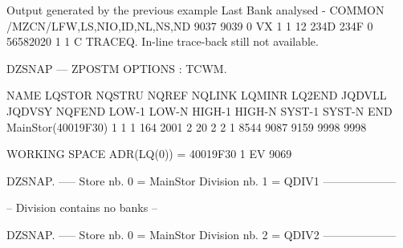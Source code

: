 \begin{landscapebody}
\begin{XMPt}{Output generated by the previous example}
Last Bank analysed - COMMON /MZCN/LFW,LS,NIO,ID,NL,NS,ND
       9037      9039   0  VX         1       1      12
          234D         234F            0     56582020            1            1            C
 TRACEQ.  In-line trace-back still not available.
                                                                                                                                 
DZSNAP --- ZPOSTM                                                                                  OPTIONS : TCWM.               
                                                                                                                                 
  NAME       LQSTOR NQSTRU  NQREF NQLINK LQMINR LQ2END JQDVLL JQDVSY NQFEND  LOW-1  LOW-N HIGH-1 HIGH-N SYST-1 SYST-N    END     
 MainStor(40019F30)      1      1      1    164   2001      2     20      2      2      1   8544   9087   9159   9998   9998     
                                                                                                                                 
 WORKING SPACE   ADR(LQ(0)) = 40019F30                                                                                           
          1    EV        9069                                                                                                    
                                                                                                                                 
DZSNAP.   -----  Store nb. 0 = MainStor Division nb. 1 = QDIV1                       --------------------                        
                                                                                                                                 
         -- Division contains no banks --                                                                                        
                                                                                                                                 
DZSNAP.   -----  Store nb. 0 = MainStor Division nb. 2 = QDIV2                       --------------------                        
                                                                                                                                 

\end{XMPt}
\end{landscapebody}
